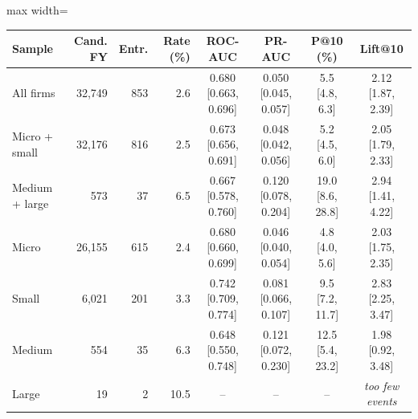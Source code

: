 \begin{table}[!htbp]
 \label{tab:size_ci}
\centering
\scriptsize
\setlength{\tabcolsep}{2.5pt}
\renewcommand{\arraystretch}{1.10}
\begin{adjustbox}{max width=\textwidth}
\begin{tabular}{lrrrcccc}
\hline
Sample & Cand. FY & Entr. & Rate (\%) & ROC-AUC & PR-AUC & P@10 (\%) & Lift@10 \\
\hline
All firms & 32,749 & 853 & 2.6 & 0.680 [0.663, 0.696] & 0.050 [0.045, 0.057] & 5.5 [4.8, 6.3] & 2.12 [1.87, 2.39] \\
Micro + small & 32,176 & 816 & 2.5 & 0.673 [0.656, 0.691] & 0.048 [0.042, 0.056] & 5.2 [4.5, 6.0] & 2.05 [1.79, 2.33] \\
Medium + large & 573 & 37 & 6.5 & 0.667 [0.578, 0.760] & 0.120 [0.078, 0.204] & 19.0 [8.6, 28.8] & 2.94 [1.41, 4.22] \\
Micro & 26,155 & 615 & 2.4 & 0.680 [0.660, 0.699] & 0.046 [0.040, 0.054] & 4.8 [4.0, 5.6] & 2.03 [1.75, 2.35] \\
Small & 6,021 & 201 & 3.3 & 0.742 [0.709, 0.774] & 0.081 [0.066, 0.107] & 9.5 [7.2, 11.7] & 2.83 [2.25, 3.47] \\
Medium & 554 & 35 & 6.3 & 0.648 [0.550, 0.748] & 0.121 [0.072, 0.230] & 12.5 [5.4, 23.2] & 1.98 [0.92, 3.48] \\
Large & 19 & 2 & 10.5 & -- & -- & -- & \textit{too few events} \\
\hline
\end{tabular}
\end{adjustbox}
\end{table}
